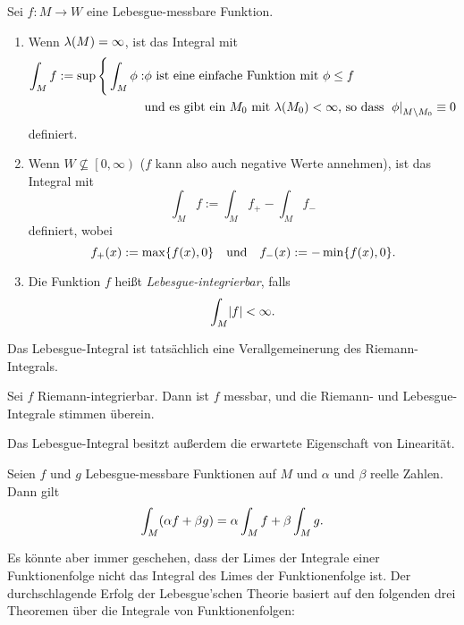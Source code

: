 \begin{definition}\label{definition:13}
	Sei \(f: M \to W\) eine Lebesgue-messbare Funktion.
	\begin{enumerate}
		\item Wenn \(\lambda\parentheses*{M} = \infty\), ist das Integral mit
		\begin{align*}
			\int_M f := \sup\Bigg\{\int_M \phi : &\phi\text{ ist eine einfache Funktion mit }\phi \le f\\
			&\text{und es gibt ein }M_0\text{ mit }\lambda\parentheses*{M_0} < \infty\text{, so dass }\left.\phi\right|_{M \setminus M_0} \equiv 0
		\end{align*}
		definiert.
		\item Wenn \(W \not\subseteq \left[0, \infty\right)\) (\(f\) kann also auch negative Werte annehmen), ist das Integral mit
		\[
			\int_M f := \int_M f_+ - \int_M f_-
		\]
		definiert, wobei
		\[
			f_+\parentheses*{x} := \max\braces*{f\parentheses*{x}, 0} \quad \text{und} \quad f_-\parentheses*{x} := -\min\braces*{f\parentheses*{x}, 0}.
		\]
		\item Die Funktion \(f\) heißt \emph{Lebesgue-integrierbar}, falls
		\[
			\int_M \absolute*{f} < \infty.
		\]
	\end{enumerate}
\end{definition}
Das Lebesgue-Integral ist tatsächlich eine Verallgemeinerung des Riemann-Integrals.

\begin{proposition}
	Sei \(f\) Riemann-integrierbar.
	Dann ist \(f\) messbar, und die Riemann- und Lebesgue-Integrale stimmen überein.
\end{proposition}

Das Lebesgue-Integral besitzt außerdem die erwartete Eigenschaft von Linearität.

\begin{proposition}
	Seien \(f\) und \(g\) Lebesgue-messbare Funktionen auf \(M\) und \(\alpha\) und \(\beta\) reelle Zahlen.
	Dann gilt
	\begin{equation}
		\int_M \parentheses*{\alpha f + \beta g} = \alpha\int_M f + \beta\int_M g.
	\end{equation}
\end{proposition}

Es könnte aber immer geschehen, dass der Limes der Integrale einer Funktionenfolge nicht das Integral des Limes der Funktionenfolge ist.
Der durchschlagende Erfolg der Lebesgue'schen Theorie basiert auf den folgenden drei Theoremen über die Integrale von Funktionenfolgen:

